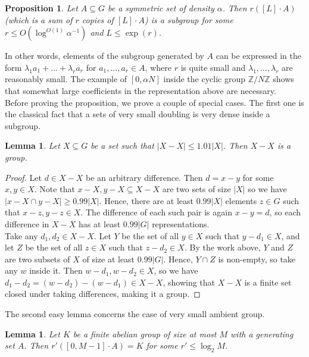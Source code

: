 \documentclass[a4paper,11pt]{article}
\numberwithin{theorem}{section}
\newtheorem{lemma}[theorem]{Lemma}
\newtheorem{proposition}[theorem]{Proposition}
\theoremstyle{definition}
\begin{document}
\begin{proposition}\label{efficientGroupGeneration}
    Let $A \subseteq G$ be a symmetric set of density $\alpha$. Then $r ([L] \cdot A)$ (which is a sum of $r$ copies of $[L]\cdot A$) is a subgroup for some $r \leq O(\log^{O(1)} \alpha^{-1})$ and $L \leq \exp(r)$. 
\end{proposition}

In other words, elements of the subgroup generated by $A$ can be expressed in the form $\lambda_1 a_1 + \dots + \lambda_r a_r$ for $a_1, \dots, a_r \in A$, where $r$ is quite small and $\lambda_1, \dots, \lambda_r$ are reasonably small. The example of $[0, \alpha N]$ inside the cyclic group $\mathbb{Z}/N\mathbb{Z}$ shows that somewhat large coefficients in the representation above are necessary.\\

Before proving the proposition, we prove a couple of special cases. The first one is the classical fact that a sets of very small doubling is very dense inside a subgroup.

\begin{lemma}\label{verysmalldoublingsbugroup}
        Let $X \subseteq G$ be a set such that $|X - X| \leq 1.01 |X|$. Then $X - X$ is a group.
\end{lemma}

    \begin{proof} Let $d \in X - X$ be an arbitrary difference. Then $d = x - y$ for some $x,y \in X$. Note that $x - X, y - X \subseteq X - X$ are two sets of size $|X|$ so we have
    $|x - X \cap y - X| \geq 0.99 |X|$. Hence, there are at least $0.99 |X|$ elements $z \in G$ such that $x - z, y- z \in X$. The difference of each such pair is again $x - y = d$, so each difference in $X - X$ has at least $0.99|G|$ representations.\\ 
    \indent Take any $d_1, d_2 \in X - X$. Let $Y$ be the set of all $y \in X$ such that $y - d_1 \in X$, and let $Z$ be the set of all $z \in X$ such that $z - d_2 \in X$. By the work above, $Y$ and $Z$ are two subsets of $X$ of size at least $0.99 |G|$. Hence, $Y \cap Z$ is non-empty, so take any $w$ inside it. Then $w - d_1, w - d_2 \in X$, so we have $d_1 - d_2 = (w - d_2) - (w - d_1) \in X - X$, showing that $X - X$ is a finite set closed under taking differences, making it a group.
    \end{proof}

The second easy lemma concerns the case of very small ambient group.

\begin{lemma}\label{smallGroupsGeneration}
    Let $K$ be a finite abelian group of size at most $M$ with a generating set $A$. Then $r' ([0, M-1] \cdot A) = K$ for some $r' \leq \log_2 M$.
\end{lemma}
\end{document}
